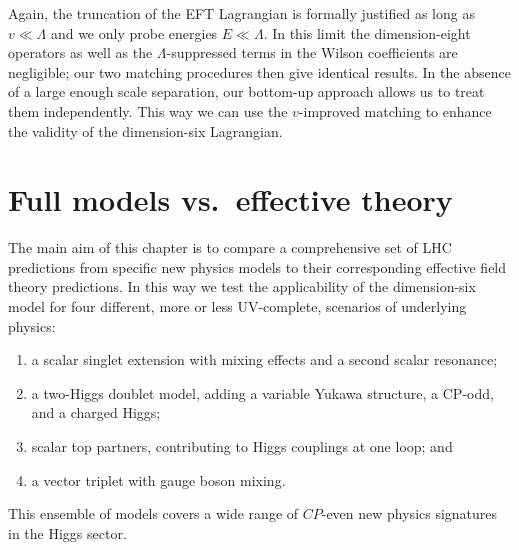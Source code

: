 Again, the truncation of the EFT Lagrangian is formally justified as
long as $v \ll \Lambda$ and we only probe energies $E \ll \Lambda$.
In this limit the dimension-eight operators as well as the
$\Lambda$-suppressed terms in the Wilson coefficients are negligible;
our two matching procedures then give identical results. In the
absence of a large enough scale separation, our bottom-up approach
allows us to treat them independently. This way we can use the
$v$-improved matching to enhance the validity of the dimension-six
Lagrangian.




\section{Full models vs.\ effective theory}
\label{sec:validity_full_vs_effective}

The main aim of this chapter is to compare a comprehensive set of LHC
predictions from specific new physics models to their corresponding
effective field theory predictions. In this way we test the
applicability of the dimension-six model for four different, more or
less UV-complete, scenarios of underlying physics:
%
\begin{enumerate}
\item a scalar singlet extension with mixing effects and a second
  scalar resonance;
\item a two-Higgs doublet model, adding a variable Yukawa structure, a
  CP-odd, and a charged Higgs;
\item scalar top partners, contributing to Higgs couplings at one
  loop; and
\item a vector triplet with gauge boson mixing.
\end{enumerate}
%
This ensemble of models covers a wide range of $CP$-even new physics
signatures in the Higgs sector.

